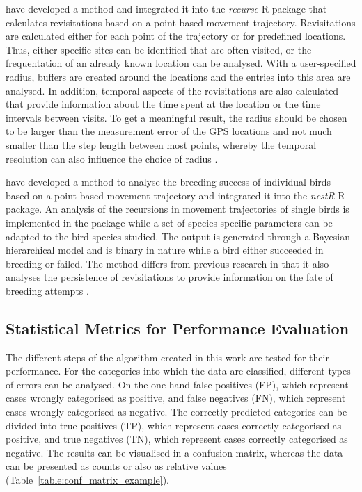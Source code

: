 \textcite{bracis2018revisit} have developed a method and integrated it into the \textit{recurse} R package that calculates revisitations based on a point-based movement trajectory. Revisitations are calculated either for each point of the trajectory or for predefined locations. Thus, either specific sites can be identified that are often visited, or the frequentation of an already known location can be analysed. With a user-specified radius, buffers are created around the locations and the entries into this area are analysed. In addition, temporal aspects of the revisitations are also calculated that provide information about the time spent at the location or the time intervals between visits. To get a meaningful result, the radius should be chosen to be larger than the measurement error of the GPS locations and not much smaller than the step length between most points, whereby the temporal resolution can also influence the choice of radius \parencite{bracis2018revisit}.

\textcite{picardi2020analysis} have developed a method to analyse the breeding success of individual birds based on a point-based movement trajectory and integrated it into the \textit{nestR} R package. An analysis of the recursions in movement trajectories of single birds is implemented in the package while a set of species-specific parameters can be adapted to the bird species studied. The output is generated through a Bayesian hierarchical model and is binary in nature while a bird either succeeded in breeding or failed. The method differs from previous research in that it also analyses the persistence of revisitations to provide information on the fate of breeding attempts \parencite{picardi2020analysis}.

\subsection{Statistical Metrics for Performance Evaluation}
The different steps of the algorithm created in this work are tested for their performance. For the categories into which the data are classified, different types of errors can be analysed. On the one hand false positives (FP), which represent cases wrongly categorised as positive, and false negatives (FN), which represent cases wrongly categorised as negative. The correctly predicted categories can be divided into true positives (TP), which represent cases correctly categorised as positive, and true negatives (TN), which represent cases correctly categorised as negative. The results can be visualised in a confusion matrix, whereas the data can be presented as counts or also as relative values \parencite{fielding_review_1997} (Table~\ref{table:conf_matrix_example}).

